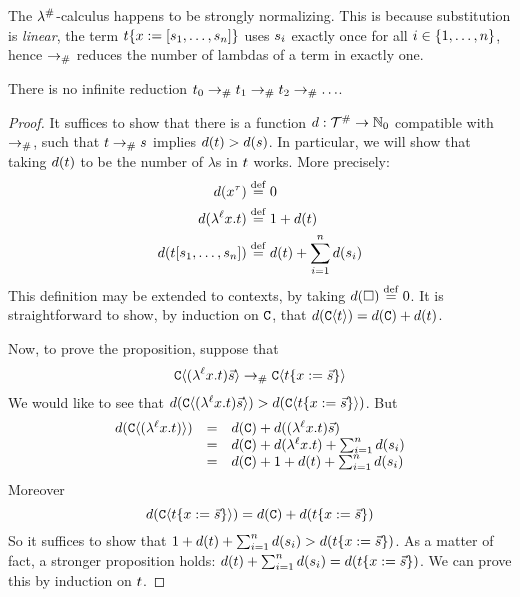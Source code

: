 The $\lambda^{\mathtt{\#}}$-calculus happens to be strongly normalizing.
This is because substitution is \emph{linear}, \ie the term
$t\{x := [s_1, \hdots, s_n]\}$ uses
$s_i$ exactly once for all $i \in \{1,\hdots,n\}$,
hence $\mathrel{\to_{\mathtt{\#}}}$ reduces the number of lambdas of a term in exactly one.


\begin{proposition}[Termination]
There is no infinite reduction $t_0 \mathrel{\to_{\mathtt{\#}}} t_1 \mathrel{\to_{\mathtt{\#}}} t_2 \mathrel{\to_{\mathtt{\#}}} \hdots$.
\end{proposition}
\begin{proof}
It suffices to show that there is a function $d : \mathcal{T}^{\mathtt{\#}} \to \mathbb{N}_0$ compatible with $\mathrel{\to_{\mathtt{\#}}}$,
\ie such that $t \mathrel{\to_{\mathtt{\#}}} s$ implies $d(t) > d(s)$.
In particular, we will show that taking $d(t)$ to be the number of $\lambda$s in $t$ works. More precisely:
\begin{equation*}\begin{split}
d(x^\tau) & \overset{\mathrm{def}}{=} 0 \\
d(\lambda^{\ell} x. t) & \overset{\mathrm{def}}{=} 1 + d(t) \\
d(t [s_1, \hdots, s_n]) & \overset{\mathrm{def}}{=} d(t) + \sum_{i=1}^n d(s_i) \\
\end{split}\end{equation*}
This definition may be extended to contexts, by taking $d(\Box) \overset{\mathrm{def}}{=} 0$.
It is straightforward to show, by induction on $\mathtt{C}$, that $d(\mathtt{C}\langle t\rangle) = d(\mathtt{C}) + d(t)$.

Now, to prove the proposition, suppose that
  \[
    \mathtt{C}\langle(\lambda^{\ell} x. t) \vec{s}\rangle \mathrel{\to_{\mathtt{\#}}} \mathtt{C}\langle t\{x := \vec{s}\}\rangle
  \]
We would like to see that
  $d(\mathtt{C}\langle(\lambda^{\ell} x. t) \vec{s}\rangle) > d(\mathtt{C}\langle t\{x := \vec{s}\}\rangle)$.
But
  \[
    \begin{array}{rcl}
    d(\mathtt{C}\langle(\lambda^{\ell} x. t)\rangle) & = & d(\mathtt{C}) + d((\lambda^{\ell} x. t) \vec{s}) \\
                                        & = & d(\mathtt{C}) + d(\lambda^{\ell} x. t) + \sum_{i=1}^n d(s_i) \\
                                        & = & d(\mathtt{C}) + 1 + d(t) + \sum_{i=1}^n d(s_i) \\
    \end{array}
  \]
Moreover
  \[
    d(\mathtt{C}\langle t\{x := \vec{s}\}\rangle) = d(\mathtt{C}) + d(t\{x := \vec{s}\})
  \]
So it suffices to show that $1 + d(t) + \sum_{i=1}^n d(s_i) > d(t\{x := \vec{s}\})$.
As a matter of fact, a stronger proposition holds:
  $d(t) + \sum_{i=1}^n d(s_i) = d(t\{x := \vec{s}\})$.
 We can prove this by induction on $t$.
\end{proof}



